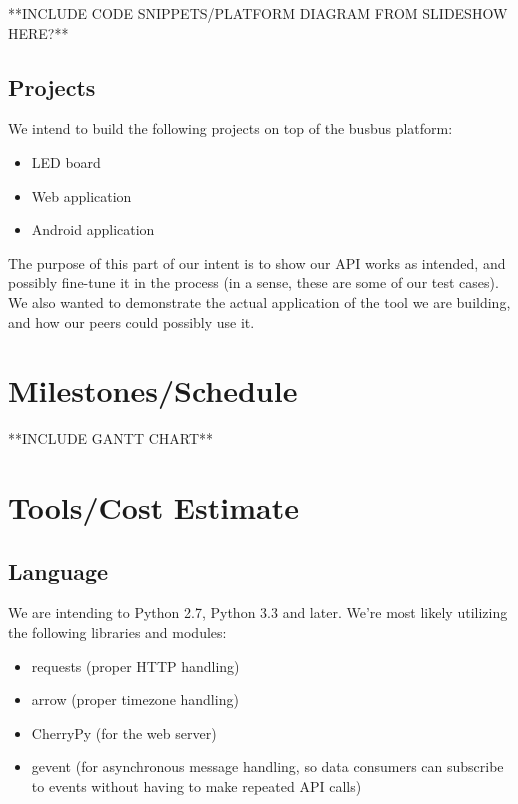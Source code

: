 \documentclass[12pt]{article}
\begin{document}
**INCLUDE CODE SNIPPETS/PLATFORM DIAGRAM FROM SLIDESHOW HERE?**

\subsection{Projects}
We intend to build the following projects on top of the busbus platform:
\begin{itemize}
\item LED board
\item Web application
\item Android application
\end{itemize}
The purpose of this part of our intent is to show our API works as intended, and possibly
fine-tune it in the process (in a sense, these are some of our test cases). We also wanted 
to demonstrate the actual application of the tool we are building, and how our peers
could possibly use it.

\section{Milestones/Schedule}
**INCLUDE GANTT CHART**

\section{Tools/Cost Estimate}
\subsection{Language}
We are intending to Python 2.7, Python 3.3 and later. We're most likely utilizing the following
libraries and modules:
\begin{itemize}
\item requests (proper HTTP handling)
\item arrow (proper timezone handling)
\item CherryPy (for the web server)
\item gevent (for asynchronous message handling, so data consumers can subscribe to events
without having to make repeated API calls)
\end{itemize}
\end{document}
